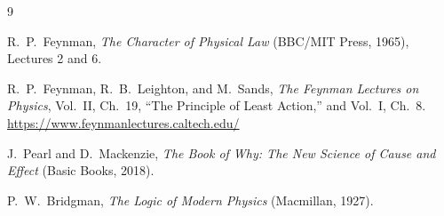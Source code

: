 \documentclass[12pt]{book}
\begin{document}
\bigskip
\begin{thebibliography}{9}

R.~P.~Feynman, \emph{The Character of Physical Law} (BBC/MIT Press, 1965), Lectures 2 and 6.

R.~P.~Feynman, R.~B.~Leighton, and M.~Sands, \emph{The Feynman Lectures on Physics}, Vol.~II, Ch.~19, ``The Principle of Least Action,'' and Vol.~I, Ch.~8.
\url{https://www.feynmanlectures.caltech.edu/}

J.~Pearl and D.~Mackenzie, \emph{The Book of Why: The New Science of Cause and Effect} (Basic Books, 2018).

P.~W.~Bridgman, \emph{The Logic of Modern Physics} (Macmillan, 1927).

\end{thebibliography}
\end{document}
